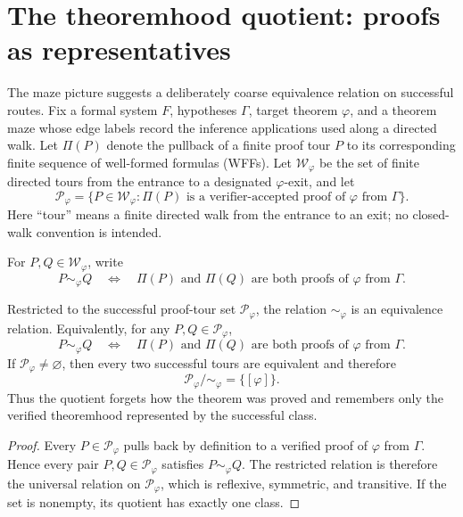 \section{The theoremhood quotient: proofs as representatives}
The maze picture suggests a deliberately coarse equivalence relation on successful routes. Fix a formal system $F$, hypotheses $\Gamma$, target theorem $\varphi$, and a theorem maze whose edge labels record the inference applications used along a directed walk. Let $\Pi(P)$ denote the pullback of a finite proof tour $P$ to its corresponding finite sequence of well-formed formulas (WFFs). Let $\mathcal W_\varphi$ be the set of finite directed tours from the entrance to a designated $\varphi$-exit, and let
\[
\mathcal P_\varphi
=
\{P\in\mathcal W_\varphi:\Pi(P)\text{ is a verifier-accepted proof of }\varphi\text{ from }\Gamma\}.
\]
Here ``tour'' means a finite directed walk from the entrance to an exit; no closed-walk convention is intended.

\begin{definition}
For $P,Q\in\mathcal W_\varphi$, write
\[
P\sim_\varphi Q
\quad\Longleftrightarrow\quad
\Pi(P)\text{ and }\Pi(Q)\text{ are both proofs of }\varphi\text{ from }\Gamma.
\]
\end{definition}

\begin{theorem}
Restricted to the successful proof-tour set $\mathcal P_\varphi$, the relation $\sim_\varphi$ is an equivalence relation. Equivalently, for any $P,Q\in\mathcal P_\varphi$,
\[
P\sim_\varphi Q
\quad\Longleftrightarrow\quad
\Pi(P)\text{ and }\Pi(Q)\text{ are both proofs of }\varphi\text{ from }\Gamma.
\]
If $\mathcal P_\varphi\neq\varnothing$, then every two successful tours are equivalent and therefore
\[
\mathcal P_\varphi/\!\sim_\varphi
=
\{[\varphi]\}.
\]
Thus the quotient forgets how the theorem was proved and remembers only the verified theoremhood represented by the successful class.
\end{theorem}
\begin{proof}
Every $P\in\mathcal P_\varphi$ pulls back by definition to a verified proof of $\varphi$ from $\Gamma$. Hence every pair $P,Q\in\mathcal P_\varphi$ satisfies $P\sim_\varphi Q$. The restricted relation is therefore the universal relation on $\mathcal P_\varphi$, which is reflexive, symmetric, and transitive. If the set is nonempty, its quotient has exactly one class.
\end{proof}


